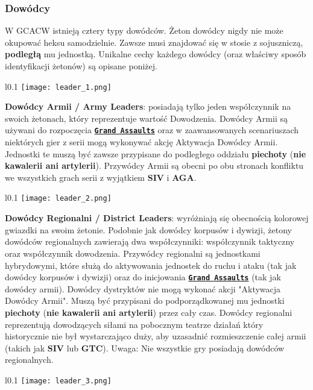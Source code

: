 \subsubsection*{Dowódcy}
W GCACW istnieją cztery typy dowódców. Żeton dowódcy nigdy nie może okupować heksu samodzielnie. Zawsze musi znajdować się w stosie z sojuszniczą, \textbf{podległą} mu jednostką. Unikalne cechy każdego dowódcy (oraz właściwy sposób identyfikacji żetonów) są opisane poniżej.\par
\begin{wrapfigure}{l}{0.1\textwidth}
  \texttt{[image: leader\_1.png]}
\end{wrapfigure}
\textbf{Dowódcy Armii / Army Leaders}: posiadają tylko jeden współczynnik na swoich żetonach, który reprezentuje wartość Dowodzenia. Dowódcy Armii są używani do rozpoczęcia \textbf{\texttt{\underline {Grand Assaults}}} oraz w zaawansowanych scenariuszach niektórych gier z serii mogą wykonywać akcję Aktywacja Dowódcy Armii. Jednostki te muszą być zawsze przypisane do podległego oddziału \textbf{piechoty} (\textbf{nie kawalerii ani artylerii}). Przywódcy Armii są obecni po obu stronach konfliktu we wszystkich grach serii z wyjątkiem \textbf{SIV} i \textbf{AGA}.\par
\begin{wrapfigure}{l}{0.1\textwidth}
  \texttt{[image: leader\_2.png]}
\end{wrapfigure}
\textbf{Dowódcy Regionalni / District Leaders}: wyróżniają się obecnością kolorowej gwiazdki na swoim żetonie. Podobnie jak dowódcy korpusów i dywizji, żetony dowódców regionalnych zawierają dwa współczynniki: współczynnik taktyczny oraz współczynnik dowodzenia. Przywódcy regionalni są jednostkami hybrydowymi, które służą do aktywowania jednostek do ruchu i ataku (tak jak dowódcy korpusów i dywizji) oraz do inicjowania \textbf{\texttt{\underline {Grand Assaults}}} (tak jak dowódcy armii). Dowódcy dystryktów nie mogą wykonać akcji "Aktywacja Dowódcy Armii". Muszą być przypisani do podporządkowanej mu jednostki \textbf{piechoty} (\textbf{nie kawalerii ani artylerii}) przez cały czas. Dowódcy regionalni reprezentują dowodzących siłami na pobocznym teatrze działań który historycznie nie był wystarczająco duży, aby uzasadnić rozmieszczenie całej armii (takich jak \textbf{SIV} lub \textbf{GTC}). Uwaga: Nie wszystkie gry posiadają dowódców regionalnych.\par
\begin{wrapfigure}{l}{0.1\textwidth}
  \texttt{[image: leader\_3.png]}
\end{wrapfigure}
